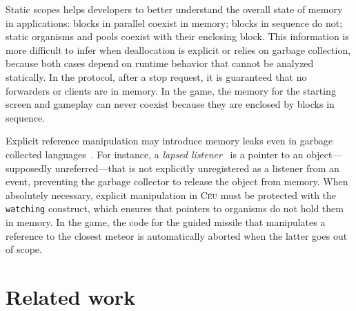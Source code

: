 \documentclass[preprint]{sigplanconf}
\newcommand{\CEU}{\textsc{C\'{e}u}\xspace}
\newcommand{\code}[1] {{\small{\texttt{#1}}}}
\newcommand{\1}{\;}
\newcommand{\2}{\;\;}
\newcommand{\3}{\;\;\;}
\newcommand{\5}{\;\;\;\;\;}
\begin{document}
Static scopes helps developers to better understand the overall state of memory 
in applications: blocks in parallel coexist in memory; blocks in sequence do 
not; static organisms and pools coexist with their enclosing block.
%
This information is more difficult to infer when deallocation is explicit or 
relies on garbage collection, because both cases depend on runtime behavior 
that cannot be analyzed statically.
%
In the protocol, after a stop request, it is guaranteed that no forwarders or 
clients are in memory.
In the game, the memory for the starting screen and gameplay can never coexist 
because they are enclosed by blocks in sequence.

Explicit reference manipulation may introduce memory leaks even in garbage 
collected languages~\cite{dobbs.loiterers}.
For instance, a \emph{lapsed listener}~\cite{gamepatterns} is a pointer to an 
object---supposedly unreferred---that is not explicitly unregistered as a
listener from an event, preventing the garbage collector to release the object 
from memory.
%
When absolutely necessary, explicit manipulation in \CEU must be protected with 
the \code{watching} construct, which ensures that pointers to organisms do not 
hold them in memory.
%
In the game, the code for the guided missile that manipulates a reference to 
the closest meteor is automatically aborted when the latter goes out of scope.

\section{Related work}
\label{sec.related}

\end{document}
